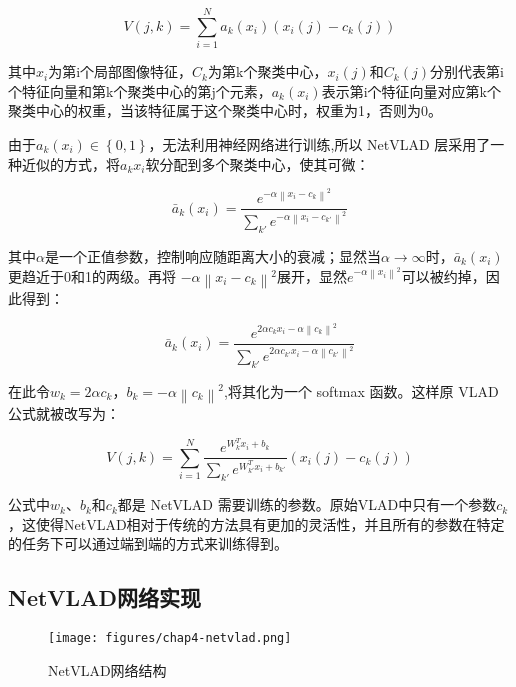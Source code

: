 \begin{equation}
V(j, k) = \sum_{i=1}^N a_k(x_i)( x_i(j) - c_k(j) )
\end{equation}

其中$x_i$为第i个局部图像特征，$C_k$为第k个聚类中心，$x_i(j)$和$C_k(j)$分别代表第i个特征向量和第k个聚类中心的第j个元素，$a_k(x_i)$表示第i个特征向量对应第k个聚类中心的权重，当该特征属于这个聚类中心时，权重为1，否则为0。

由于$a_k(x_i)\in\left\{0,1\right\}$，无法利用神经网络进行训练,所以 NetVLAD 层采用了一种近似的方式，将$a_k{x_i}$软分配到多个聚类中心，使其可微：

\begin{equation}
\bar{a}_k(x_i) = \frac{e^{-\alpha\left\|x_i-c_k\right\|^2}}{\sum_{k'}e^{-\alpha\left\|x_i-c_{k'}\right\|^2}}
\end{equation}

其中$\alpha$是一个正值参数，控制响应随距离大小的衰减；显然当$\alpha \to \infty$时，$\bar{a}_k(x_i)$更趋近于0和1的两级。再将 $-\alpha\left\|{x_i-c_k}\right\|^2$展开，显然$e^{-\alpha\left\|{x_i}\right\|^2}$可以被约掉，因此得到： 

\begin{equation}
\bar{a}_k(x_i) = \frac{e^{2\alpha c_k x_i-\alpha\left\|c_k\right\|^2}}{\sum_{k'}e^{2\alpha c_{k'} x_i-\alpha\left\|c_{k'}\right\|^2}} 
\end{equation}

在此令$w_k=2\alpha c_k$，$b_k=-\alpha\left\|c_k\right\|^2$,将其化为一个 softmax 函数。这样原 VLAD 公式就被改写为：   

\begin{equation}
V(j, k) = \sum_{i=1}^N \frac{e^{W_k^{T}x_i+b_k}}{\sum_{k'}e^{W_{k'}^{T}x_i+b_{k'}}}( x_i(j) - c_k(j) )
\end{equation} 

公式中$ {w_k} $、$ {b_k} $和$ {c_k} $都是 NetVLAD 需要训练的参数。原始VLAD中只有一个参数$ {c_k} $，这使得NetVLAD相对于传统的方法具有更加的灵活性，并且所有的参数在特定的任务下可以通过端到端的方式来训练得到。

\subsection{NetVLAD网络实现} 

\begin{figure}[htbp]
	\centering
	\texttt{[image: figures/chap4-netvlad.png]}
	\caption{NetVLAD网络结构}
\end{figure} 
 
